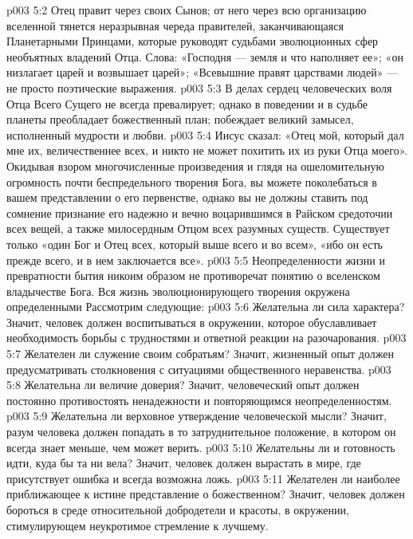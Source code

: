 \vs p003 5:2 Отец правит через своих Сынов; от него через всю организацию вселенной тянется неразрывная череда правителей, заканчивающаяся Планетарными Принцами, которые руководят судьбами эволюционных сфер необъятных владений Отца. Слова: «Господня --- земля и что наполняет ее»; «он низлагает царей и возвышает царей»; «Всевышние правят царствами людей» --- не просто поэтические выражения.
\vs p003 5:3 В делах сердец человеческих воля Отца Всего Сущего не всегда превалирует; однако в поведении и в судьбе планеты преобладает божественный план; побеждает великий замысел, исполненный мудрости и любви.
\vs p003 5:4 Иисус сказал: «Отец мой, который дал мне их, величественнее всех, и никто не может похитить их из руки Отца моего». Окидывая взором многочисленные произведения и глядя на ошеломительную огромность почти беспредельного творения Бога, вы можете поколебаться в вашем представлении о его первенстве, однако вы не должны ставить под сомнение признание его надежно и вечно воцарившимся в Райском средоточии всех вещей, а также милосердным Отцом всех разумных существ. Существует только «один Бог и Отец всех, который выше всего и во всем», «ибо он есть прежде всего, и в нем заключается все».
\vs p003 5:5 \pc Неопределенности жизни и превратности бытия никоим образом не противоречат понятию о вселенском владычестве Бога. Вся жизнь эволюционирующего творения окружена определенными  Рассмотрим следующие:
\vs p003 5:6 \bibnobreakspace Желательна ли  сила характера? Значит, человек должен воспитываться в окружении, которое обуславливает необходимость борьбы с трудностями и ответной реакции на разочарования.
\vs p003 5:7 \bibnobreakspace Желателен ли  служение своим собратьям? Значит, жизненный опыт должен предусматривать столкновения с ситуациями общественного неравенства.
\vs p003 5:8 \bibnobreakspace Желательна ли  величие доверия? Значит, человеческий опыт должен постоянно противостоять ненадежности и повторяющимся неопределенностям.
\vs p003 5:9 \bibnobreakspace Желательна ли  верховное утверждение человеческой мысли? Значит, разум человека должен попадать в то затруднительное положение, в котором он всегда знает меньше, чем может верить.
\vs p003 5:10 \bibnobreakspace Желательны ли  и готовность идти, куда бы та ни вела? Значит, человек должен вырастать в мире, где присутствует ошибка и всегда возможна ложь.
\vs p003 5:11 \bibnobreakspace Желателен ли  наиболее приближающее к истине представление о божественном? Значит, человек должен бороться в среде относительной добродетели и красоты, в окружении, стимулирующем неукротимое стремление к лучшему.
